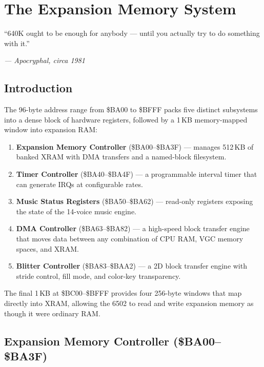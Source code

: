 \chapter{The Expansion Memory System}

\epigraph{``640K ought to be enough for anybody --- until you actually try to
do something with it.''}{\textit{--- Apocryphal, circa 1981}}

\section*{Introduction}

The 96-byte address range from \$BA00 to \$BFFF packs five distinct
subsystems into a dense block of hardware registers, followed by a 1\,KB
memory-mapped window into expansion RAM:

\begin{enumerate}
  \item \textbf{Expansion Memory Controller} (\$BA00--\$BA3F) --- manages
        512\,KB of banked XRAM with DMA transfers and a named-block filesystem.
  \item \textbf{Timer Controller} (\$BA40--\$BA4F) --- a programmable interval
        timer that can generate IRQs at configurable rates.
  \item \textbf{Music Status Registers} (\$BA50--\$BA62) --- read-only
        registers exposing the state of the 14-voice music engine.
  \item \textbf{DMA Controller} (\$BA63--\$BA82) --- a high-speed block
        transfer engine that moves data between any combination of CPU RAM,
        VGC memory spaces, and XRAM.
  \item \textbf{Blitter Controller} (\$BA83--\$BAA2) --- a 2D block transfer
        engine with stride control, fill mode, and color-key transparency.
\end{enumerate}

The final 1\,KB at \$BC00--\$BFFF provides four 256-byte windows that
map directly into XRAM, allowing the 6502 to read and write expansion
memory as though it were ordinary RAM.


\section{Expansion Memory Controller (\$BA00--\$BA3F)}
\label{sec:xmc-registers}

